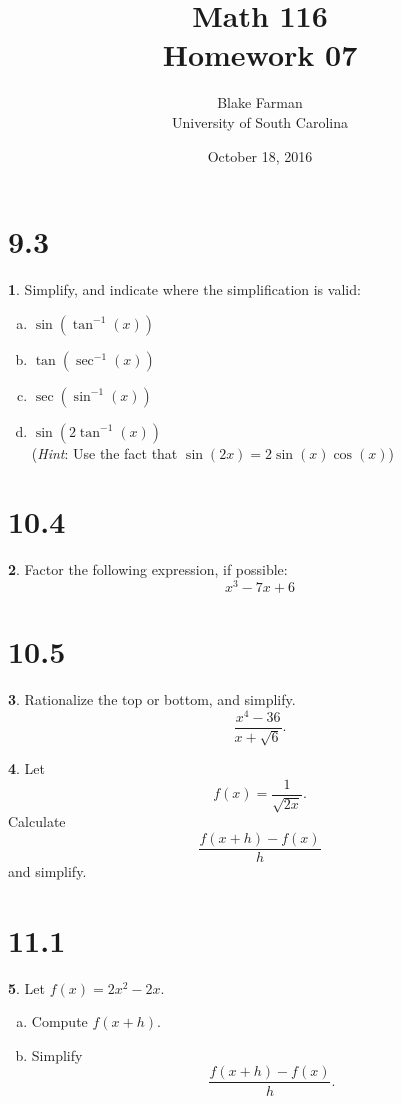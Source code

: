 \documentclass[12pt]{book}
\author{Blake Farman\\University of South Carolina}
\title{Math 116\\Homework 07}
\date{October 18, 2016}
\theoremstyle{definition}
\newtheorem{thm}{}
\begin{document}
\maketitle

\section*{9.3}
\renewcommand{\exp}[1]{\operatorname{e}^{#1}}

\setcounter{thm}{3}
\begin{thm}
  Simplify, and indicate where the simplification is valid:
  \begin{enumerate}[(a)]
  \item
    $\displaystyle{\sin\left(\tan^{-1}(x)\right)}$
  \item
    $\displaystyle{\tan\left(\sec^{-1}(x)\right)}$
  \item
    $\displaystyle{\sec\left(\sin^{-1}(x)\right)}$
  \item
    $\displaystyle{\sin\left(2\tan^{-1}(x)\right)}$\\
    ({\it Hint}: Use the fact that $\sin(2x) = 2\sin(x)\cos(x)$)
  \end{enumerate}
\end{thm}

\section*{10.4}

\setcounter{thm}{1}
\begin{thm}
  Factor the following expression, if possible:
  $$x^3 -7x + 6$$
\end{thm}

\section*{10.5}

\setcounter{thm}{5}
\begin{thm}
  Rationalize the top or bottom, and simplify.
  $$\frac{x^4 - 36}{x + \sqrt{6}}.$$
\end{thm}

\setcounter{thm}{7}
\begin{thm}
  Let 
  $$f(x) = \frac{1}{\sqrt{2x}}.$$
  Calculate
  $$\frac{f(x + h) - f(x)}{h}$$
  and simplify.
\end{thm}

\section*{11.1}

\setcounter{thm}{1}
\begin{thm}
  Let $f(x) = 2x^2 - 2x$.
  \begin{enumerate}[(a)]
  \item
    Compute $f(x + h)$.
  \item
    Simplify 
    $$\frac{f(x + h) - f(x)}{h}.$$
  \end{enumerate}
\end{thm}
\end{document}
